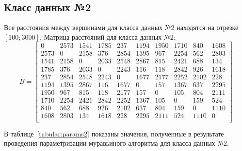 \subsection{Класс данных №2}

Все расстояния между вершинами для класса данных №2 находятся на отрезке $[100; 3000]$. 
Матрица расстояний для класса данных №2:
\begin{equation}
B = 
\begin{bmatrix}
0 & 2573 & 1541 & 1785 & 237 & 1194 & 1950 & 1710 & 840 & 1608 \\
2573 & 0 & 2158 & 376 & 2854 & 1395 & 967 & 2254 & 562 & 2803 \\
1541 & 2158 & 0 & 2033 & 2548 & 2867 & 815 & 2421 & 688 & 134 \\
1785 & 376 & 2033 & 0 & 2243 & 116 & 118 & 2842 & 926 & 1618 \\
237 & 2854 & 2548 & 2243 & 0 & 1677 & 2177 & 2252 & 2102 & 228 \\
1194 & 1395 & 2867 & 116 & 1677 & 0 & 157 & 1367 & 637 & 2295 \\
1950 & 967 & 815 & 118 & 2177 & 157 & 0 & 105 & 804 & 2111 \\
1710 & 2254 & 2421 & 2842 & 2252 & 1367 & 105 & 0 & 159 & 524 \\
840 & 562 & 688 & 926 & 2102 & 637 & 804 & 159 & 0 & 1110 \\
1608 & 2803 & 134 & 1618 & 228 & 2295 & 2111 & 524 & 1110 & 0 \\
\end{bmatrix}
\end{equation}

В таблице~\ref{tabular:params2} показаны значения, полученные в результате проведения параметризации муравьиного алгоритма для класса данных №2.

